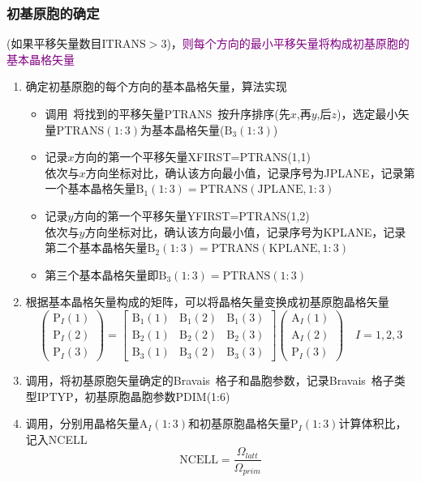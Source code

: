 \documentclass{article}      %
\begin{document}
\subsubsection{初基原胞的确定}
(如果平移矢量数目$\mathrm{ITRANS}>3$)，\textcolor{purple}{则每个方向的最小平移矢量将构成初基原胞的基本晶格矢量}
\begin{enumerate}
	\item 确定初基原胞的每个方向的基本晶格矢量，算法实现
		\begin{itemize}
			\item 调用~将找到的平移矢量\textrm{PTRANS}~按升序排序(先$x$,再$y$,后$z$)，选定最小矢量$\mathrm{PTRANS}(1:3)$为基本晶格矢量($\mathrm{B}_3(1:3)$)
			\item 记录$x$方向的第一个平移矢量\textrm{XFIRST}=\textrm{PTRANS}(1,1)\\
				依次与$x$方向坐标对比，确认该方向最小值，记录序号为\textrm{JPLANE}，记录第一个基本晶格矢量$\mathrm{B}_1(1:3)=\mathrm{PTRANS(JPLANE,1:3)}$
			\item 记录$y$方向的第一个平移矢量\textrm{YFIRST}=\textrm{PTRANS}(1,2)\\
				依次与$y$方向坐标对比，确认该方向最小值，记录序号为\textrm{KPLANE}，记录第二个基本晶格矢量$\mathrm{B}_2(1:3)=\mathrm{PTRANS(KPLANE,1:3)}$
			\item 第三个基本晶格矢量即$\mathrm{B}_3(1:3)=\mathrm{PTRANS}(1:3)$
		\end{itemize}
	\item 根据基本晶格矢量构成的矩阵，可以将晶格矢量变换成初基原胞晶格矢量
		\begin{displaymath}
			\begin{pmatrix}
				\mathrm{P}_I(1)\\\mathrm{P}_I(2)\\\mathrm{P}_I(3)
			\end{pmatrix}=
			\begin{bmatrix}
				\mathrm{B}_1(1) & \mathrm{B}_1(2) & \mathrm{B}_1(3) \\
				\mathrm{B}_2(1) & \mathrm{B}_2(2) & \mathrm{B}_2(3) \\
				\mathrm{B}_3(1) & \mathrm{B}_3(2) & \mathrm{B}_3(3)
			\end{bmatrix}
			\begin{pmatrix}
				\mathrm{A}_I(1)\\\mathrm{A}_I(2)\\\mathrm{P}_I(3)
			\end{pmatrix}\quad I=1,2,3
		\end{displaymath}
	\item 调用，将初基原胞矢量确定的\textrm{Bravais~}格子和晶胞参数，记录\textrm{Bravais~}格子类型\textrm{IPTYP}，初基原胞晶胞参数\textrm{PDIM(1:6)}
	\item 调用，分别用晶格矢量$\mathrm{A}_I(1:3)$和初基原胞晶格矢量$\mathrm{P}_I(1:3)$计算体积比，记入\textrm{NCELL}
\begin{displaymath}
	\mathrm{NCELL}=\dfrac{\Omega_{latt}}{\Omega_{prim}}
\end{displaymath}
\end{enumerate}
\end{document}
